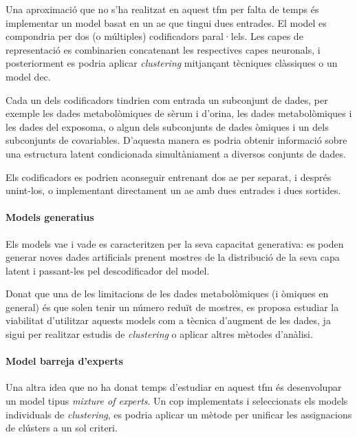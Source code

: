 \documentclass[CAT,BIB]{TFUOC}%
\begin{document}
            Una aproximació que no s'ha realitzat en aquest \gls{tfm}
            per falta de temps és
            implementar un model basat en un \gls{ae}
            que tingui dues entrades.
            El model es compondria per dos (o múltiples) codificadors paral·lels.
            Les capes de representació es combinarien concatenant
            les respectives capes neuronals,
            i posteriorment es podria aplicar \textit{clustering}
            mitjançant tècniques clàssiques o un model \gls{dec}.

            Cada un dels codificadors tindrien com entrada un subconjunt de dades,
            per exemple les dades metabolòmiques de sèrum i d'orina,
            les dades metabolòmiques i les dades del exposoma,
            o algun dels subconjunts de dades òmiques i un dels subconjunts de covariables.
            D'aquesta manera es podria obtenir informació sobre una estructura latent
            condicionada simultàniament a diversos conjunts de dades.

            Els codificadors es podrien aconseguir entrenant dos \gls{ae} per separat,
            i després unint-los,
            o implementant directament un \gls{ae} amb dues entrades i dues sortides.

        \paragraph{Models generatius}
            Els models \gls{vae} i \gls{vade} es caracteritzen
            per la seva capacitat generativa:
            es poden generar noves dades artificials
            prenent mostres de la distribució de la seva capa latent
            i passant-les pel descodificador del model.

            Donat que una de les limitacions de les dades metabolòmiques
            (i òmiques en general)
            és que solen tenir un número reduït de mostres,
            es proposa estudiar la viabilitat d'utilitzar aquests models
            com a tècnica d'augment de les dades,
            ja sigui per realitzar estudis de \textit{clustering}
            o aplicar altres mètodes d'anàlisi.

        \paragraph{Model barreja d'experts}
            Una altra idea que no ha donat temps d'estudiar en aquest \gls{tfm}
            és desenvolupar un model tipus \textit{mixture of experts}.
            Un cop implementats i seleccionats els models individuals de \textit{clustering},
            es podria aplicar un mètode per unificar les assignacions
            de clústers a un sol criteri.
\end{document}
